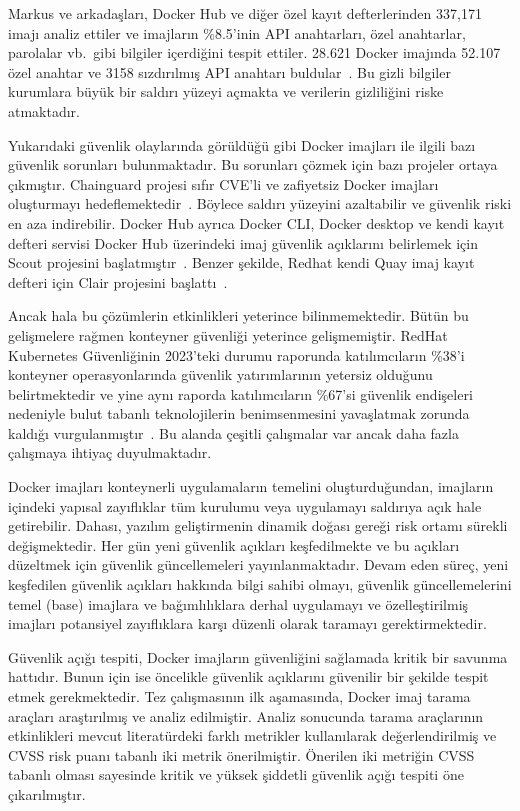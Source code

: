 Markus ve arkadaşları, Docker Hub ve diğer özel kayıt defterlerinden 337,171 imajı analiz ettiler ve imajların \%8.5'inin API anahtarları, özel anahtarlar, parolalar vb.\ gibi bilgiler içerdiğini tespit ettiler. 28.621 Docker imajında 52.107 özel anahtar ve 3158 sızdırılmış API anahtarı buldular~\autocite{Dahlmanns_2023}. Bu gizli bilgiler kurumlara büyük bir saldırı yüzeyi açmakta ve verilerin gizliliğini riske atmaktadır.

Yukarıdaki güvenlik olaylarında görüldüğü gibi Docker imajları ile ilgili bazı güvenlik sorunları bulunmaktadır. Bu sorunları çözmek için bazı projeler ortaya çıkmıştır. Chainguard projesi sıfır CVE'li ve zafiyetsiz Docker imajları oluşturmayı hedeflemektedir~\autocite{ChainGuardImages}. Böylece saldırı yüzeyini azaltabilir ve güvenlik riski en aza indirebilir. Docker Hub ayrıca Docker CLI, Docker desktop ve kendi kayıt defteri servisi Docker Hub üzerindeki imaj güvenlik açıklarını belirlemek için Scout projesini başlatmıştır~\autocite{DockerScout}. Benzer şekilde, Redhat kendi Quay imaj kayıt defteri için Clair projesini başlattı~\autocite{QuayRegistry}.

Ancak hala bu çözümlerin etkinlikleri yeterince bilinmemektedir. Bütün bu gelişmelere rağmen konteyner güvenliği yeterince gelişmemiştir. RedHat Kubernetes Güvenliğinin 2023'teki durumu raporunda katılımcıların \%38'i konteyner operasyonlarında güvenlik yatırımlarının yetersiz olduğunu belirtmektedir ve yine aynı raporda katılımcıların \%67'si güvenlik endişeleri nedeniyle bulut tabanlı teknolojilerin benimsenmesini yavaşlatmak zorunda kaldığı vurgulanmıştır~\autocite{RedhatTheStateofKubernetesSecurityin2023}. Bu alanda çeşitli çalışmalar var ancak daha fazla çalışmaya ihtiyaç duyulmaktadır.

Docker imajları konteynerli uygulamaların temelini oluşturduğundan, imajların içindeki yapısal zayıflıklar tüm kurulumu veya uygulamayı saldırıya açık hale getirebilir. Dahası, yazılım geliştirmenin dinamik doğası gereği risk ortamı sürekli değişmektedir. Her gün yeni güvenlik açıkları keşfedilmekte ve bu açıkları düzeltmek için güvenlik güncellemeleri yayınlanmaktadır. Devam eden süreç, yeni keşfedilen güvenlik açıkları hakkında bilgi sahibi olmayı, güvenlik güncellemelerini temel (base) imajlara ve bağımlılıklara derhal uygulamayı ve özelleştirilmiş imajları potansiyel zayıflıklara karşı düzenli olarak taramayı gerektirmektedir.

Güvenlik açığı tespiti, Docker imajların güvenliğini sağlamada kritik bir savunma hattıdır. Bunun için ise öncelikle güvenlik açıklarını güvenilir bir şekilde tespit etmek gerekmektedir. Tez çalışmasının ilk aşamasında, Docker imaj tarama araçları araştırılmış ve analiz edilmiştir. Analiz sonucunda tarama araçlarının etkinlikleri mevcut literatürdeki farklı metrikler kullanılarak değerlendirilmiş ve CVSS risk puanı tabanlı iki metrik önerilmiştir. Önerilen iki metriğin CVSS tabanlı olması sayesinde kritik ve yüksek şiddetli güvenlik açığı tespiti öne çıkarılmıştır.

